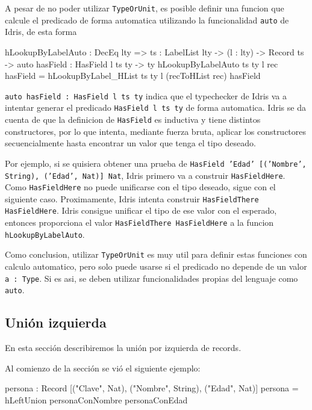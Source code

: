 A pesar de no poder utilizar \texttt{TypeOrUnit}, es posible definir una funcion que calcule el predicado de forma automatica utilizando la funcionalidad \texttt{auto} de Idris, de esta forma

\begin{code}
hLookupByLabelAuto : DecEq lty => {ts : LabelList lty} -> 
  (l : lty) -> Record ts -> 
  {auto hasField : HasField l ts ty} -> ty
hLookupByLabelAuto {ts} {ty} l rec {hasField} = 
  hLookupByLabel_HList {ts} {ty} l (recToHList rec) hasField
\end{code}

\texttt{auto hasField : HasField l ts ty} indica que el typechecker de Idris va a intentar generar el predicado \texttt{HasField l ts ty} de forma automatica. Idris se da cuenta de que la definicion de \texttt{HasField} es inductiva y tiene distintos constructores, por lo que intenta, mediante fuerza bruta, aplicar los constructores secuencialmente hasta encontrar un valor que tenga el tipo deseado.

Por ejemplo, si se quisiera obtener una prueba de \texttt{HasField 'Edad' [('Nombre', String), ('Edad', Nat)] Nat}, Idris primero va a construir \texttt{HasFieldHere}. Como \texttt{HasFieldHere} no puede unificarse con el tipo deseado, sigue con el siguiente caso. Proximamente, Idris intenta construir \texttt{HasFieldThere HasFieldHere}. Idris consigue unificar el tipo de ese valor con el esperado, entonces proporciona el valor \texttt{HasFieldThere HasFieldHere} a la funcion \texttt{hLookupByLabelAuto}.

Como conclusion, utilizar \texttt{TypeOrUnit} es muy util para definir estas funciones con calculo automatico, pero solo puede usarse si el predicado no depende de un valor \texttt{a : Type}. Si es asi, se deben utilizar funcionalidades propias del lenguaje como \texttt{auto}.

\subsection{Unión izquierda}

En esta sección describiremos la unión por izquierda de records. 

Al comienzo de la sección se vió el siguiente ejemplo:

\begin{code}
persona : Record [("Clave", Nat), ("Nombre", String), 
  ("Edad", Nat)]
persona = hLeftUnion personaConNombre personaConEdad
\end{code}

